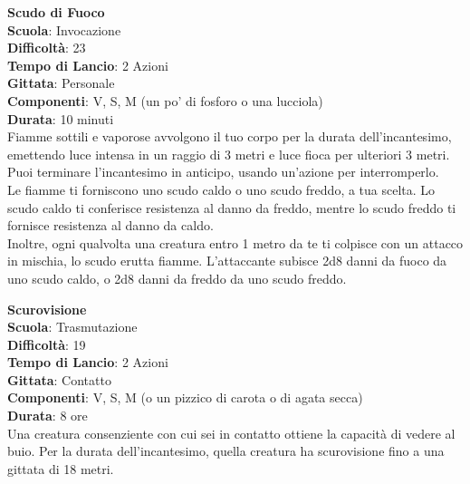 \begin{multicols}{2}
\medskip\textbf{Scudo di Fuoco}\\
\textbf{Scuola}: Invocazione\\
\textbf{Difficoltà}: 23\\
\textbf{Tempo di Lancio}: 2 Azioni\\
\textbf{Gittata}: Personale\\
\textbf{Componenti}: V, S, M (un po' di fosforo o una lucciola) \\
\textbf{Durata}: 10 minuti\\
Fiamme sottili e vaporose avvolgono il tuo corpo per la durata dell'incantesimo, emettendo luce intensa in un raggio di 3 metri e luce fioca per ulteriori 3 metri. Puoi terminare l'incantesimo in anticipo, usando un'azione per interromperlo.\\
Le fiamme ti forniscono uno scudo caldo o uno scudo freddo, a tua scelta. Lo scudo caldo ti conferisce resistenza al danno da freddo, mentre lo scudo freddo ti fornisce resistenza al danno da caldo.\\
Inoltre, ogni qualvolta una creatura entro 1 metro da te ti colpisce con un attacco in mischia, lo scudo erutta fiamme. L'attaccante subisce 2d8 danni da fuoco da uno scudo caldo, o 2d8 danni da freddo da uno scudo freddo.

\medskip\textbf{Scurovisione}\\
\textbf{Scuola}: Trasmutazione\\
\textbf{Difficoltà}: 19\\
\textbf{Tempo di Lancio}: 2 Azioni\\
\textbf{Gittata}: Contatto\\
\textbf{Componenti}: V, S, M (o un pizzico di carota o di agata secca)\\
\textbf{Durata}: 8 ore\\
Una creatura consenziente con cui sei in contatto ottiene la capacità di vedere al buio. Per la durata dell'incantesimo, quella creatura ha scurovisione fino a una gittata di 18 metri.


\end{multicols}
